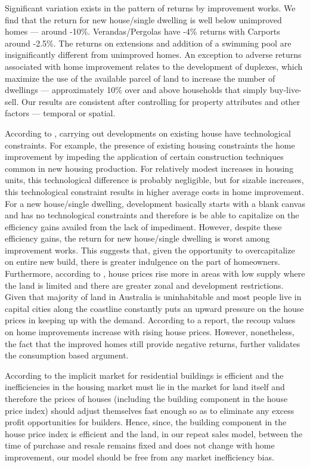 \documentclass[AEJ,reqno, draftmode]{AEA} %
\begin{document}
Significant variation exists in the pattern of returns by improvement works. We find that the return for new house/single dwelling is well below unimproved homes --- around -10\%. Verandas/Pergolas have -4\% returns with Carports around -2.5\%. The returns on extensions and addition of a swimming pool are insignificantly different from unimproved homes. An exception to adverse returns associated with home improvement relates to the development of duplexes, which maximize the use of the available parcel of land to increase the number of dwellings --- approximately 10\% over and above households that simply buy-live-sell. Our results are consistent after controlling for property attributes and other factors --- temporal or spatial.

According to \citet{potepan1989interest}, carrying out developments on existing house have technological constraints. For example, the presence of existing housing constraints the home improvement by impeding the application of certain construction techniques common in new housing production. For relatively modest increases in housing units, this technological difference is probably negligible, but for sizable increases, this technological constraint results in higher average costs in home improvement. For a new house/single dwelling, development basically starts with a blank canvas and has no technological constraints and therefore is be able to capitalize on the efficiency gains availed from the lack of impediment. However, despite these efficiency gains, the return for new house/single dwelling is worst among improvement works. This suggests that, given the opportunity to overcapitalize on entire new build, there is greater indulgence on the part of homeowners. Furthermore, according to \citep{glaeser2008housing}, house prices rise more in areas with low supply where the land is limited and there are greater zonal and development restrictions. Given that majority of land in Australia is uninhabitable and most people live in capital cities along the coastline constantly puts an upward pressure on the house prices in keeping up with the demand. According to a \citet{jointcentreharvard} report, the recoup values on home improvements increase with rising house prices. However, nonetheless, the fact that the improved homes still provide negative returns, further validates the consumption based argument.

According to \citet{rosenthal1999residential} the implicit market for residential buildings is efficient and the inefficiencies in the housing market must lie in the market for land itself and therefore the prices of houses (including the building component in the house price index) should adjust themselves fast enough so as to eliminate any excess profit opportunities for builders. Hence, since, the building component in the house price index is efficient and the land, in our repeat sales model, between the time of purchase and resale remains fixed and does not change with home improvement, our model should be free from any market inefficiency bias.
\end{document}
